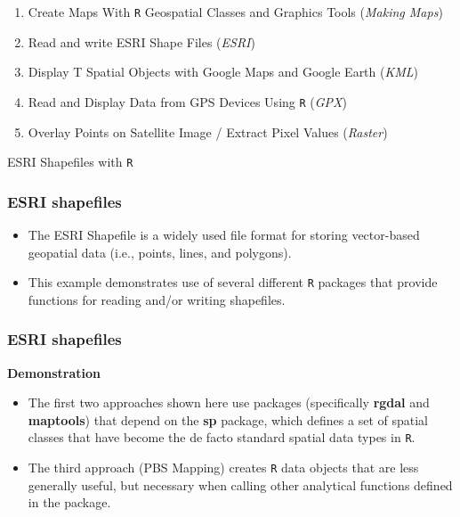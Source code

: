 \documentclass{beamer}
\begin{document}
\begin{frame}
\Large
\begin{enumerate}
\item Create Maps With \texttt{R} Geospatial Classes and Graphics Tools (\textit{Making Maps})
\item Read and write ESRI Shape Files (\textit{ESRI})
\item Display T Spatial Objects with Google Maps and Google Earth (\textit{KML})
\item Read and Display Data from GPS Devices Using \texttt{R} (\textit{GPX})
\item Overlay Points on Satellite Image / Extract Pixel Values (\textit{Raster})
\end{enumerate}
\end{frame}
\begin{frame}
\huge
ESRI Shapefiles with \texttt{R}
\end{frame}
\begin{frame}
\frametitle{ESRI shapefiles}
\begin{itemize}
\item The ESRI Shapefile is a widely used file format for storing vector-based geopatial data (i.e., points, lines, and polygons).\item  This example demonstrates use of several different \texttt{R} packages that provide functions for reading and/or writing shapefiles.
\end{itemize}
\end{frame}
\begin{frame}
\frametitle{ESRI shapefiles}
\vspace{-1cm}
\textbf{Demonstration}\\

\begin{itemize}
\item The first two approaches  shown here use packages (specifically \textbf{rgdal} and \textbf{maptools}) that depend on the \textbf{sp} package, which defines a set of spatial classes that have become the de facto standard spatial data types in \texttt{R}. \item The third approach (PBS Mapping) creates \texttt{R} data objects that are less generally useful, but necessary when calling other analytical functions defined in the package.
\end{itemize} 
\end{frame}
\end{document}
